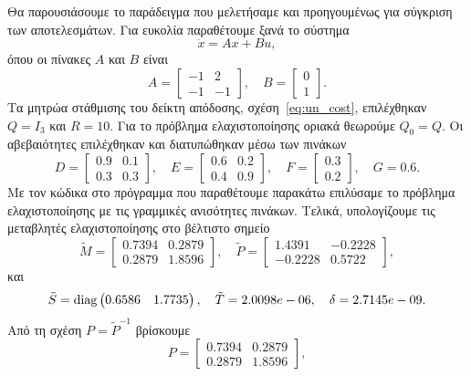 Θα παρουσιάσουμε το παράδειγμα που μελετήσαμε και προηγουμένως για σύγκριση των
αποτελεσμάτων. Για ευκολία παραθέτουμε ξανά το σύστημα
\[
    \dot{x} = Ax + Bu,
\]
όπου οι πίνακες \( A \) και \( B \) είναι
\[
    A =
    \begin{bmatrix}
        -1 & 2 \\
        -1 & -1
    \end{bmatrix}, \quad
    B = \begin{bmatrix}0 \\ 1\end{bmatrix}.
\]
Τα μητρώα στάθμισης του δείκτη απόδοσης, σχέση~\eqref{eq:un_cost}, επιλέχθηκαν
\( Q = I_3 \) και \( R = 10 \). Για το πρόβλημα ελαχιστοποίησης οριακά θεωρούμε
\( Q_0 = Q \). Οι αβεβαιότητες επιλέχθηκαν και διατυπώθηκαν μέσω των πινάκων
\[
    D =
    \begin{bmatrix}
        0.9 & 0.1 \\
        0.3 & 0.3
    \end{bmatrix},\quad
    E =
    \begin{bmatrix}
        0.6 & 0.2 \\
        0.4 & 0.9
    \end{bmatrix},\quad
    F =
    \begin{bmatrix}
        0.3 \\ 0.2
    \end{bmatrix},\quad
    G = 0.6.
\]
Με τον κώδικα στο πρόγραμμα  που παραθέτουμε παρακάτω επιλύσαμε το
πρόβλημα ελαχιστοποίησης με τις γραμμικές ανισότητες πινάκων. Τελικά,
υπολογίζουμε τις μεταβλητές ελαχιστοποίησης στο βέλτιστο σημείο
\[
    \tilde{M} =
    \begin{bmatrix}
        0.7394 & 0.2879 \\
        0.2879 & 1.8596
    \end{bmatrix},\quad
    \tilde{P} =
    \begin{bmatrix}
        1.4391 & -0.2228 \\
        -0.2228 & 0.5722
    \end{bmatrix},
\]
και
\[
    \tilde{S} = \operatorname{diag}
    \begin{pmatrix}
        0.6586 & 1.7735
    \end{pmatrix},\quad
    \tilde{T} = 2.0098e-06, \quad
    \delta = 2.7145e-09.
\]
Από τη σχέση \( P = \tilde{P}^{-1} \) βρίσκουμε
\[
    P =
    \begin{bmatrix}
        0.7394 & 0.2879 \\
        0.2879 & 1.8596
    \end{bmatrix},
\]
